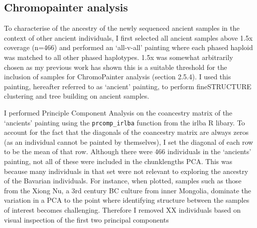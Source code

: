 \subsection{Chromopainter analysis}

To characterise of the ancestry of the newly sequenced ancient samples in the context of other ancient individuals, I first selected all ancient samples above 1.5x coverage (n=466) and performed an `all-v-all' painting where each phased haploid was matched to all other phased haplotypes. 1.5x was somewhat arbitrarily chosen as my previous work has shown this is a suitable threshold for the inclusion of samples for ChromoPainter analysis (section 2.5.4). I used this painting, hereafter referred to as `ancient' painting, to perform fineSTRUCTURE clustering and tree building on ancient samples. 

I performed Principle Component Analysis on the coancestry matrix of the `ancients' painting using the \texttt{prcomp\_irlba} function from the irlba R libary. To account for the fact that the diagonals of the coancestry matrix are always zeros (as an individual cannot be painted by themselves), I set the diagonal of each row to be the mean of that row. Although there were 466 individuals in the `ancients' painting, not all of these were included in the chunklengths PCA. This was because many individuals in that set were not relevant to exploring the ancestry of the Bavarian individuals. For instance, when plotted, samples such as those from the Xiong Nu, a 3rd century BC culture from inner Mongolia, dominate the variation in a PCA to the point where identifying structure between the samples of interest becomes challenging. Therefore I removed XX individuals based on visual inspection of the first two principal components

